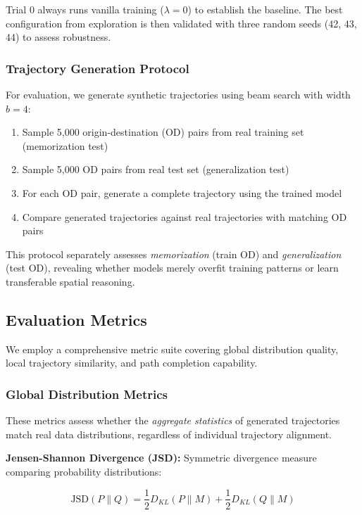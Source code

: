 Trial 0 always runs vanilla training ($\lambda = 0$) to establish the baseline. The best configuration from exploration is then validated with three random seeds (42, 43, 44) to assess robustness.

\subsubsection{Trajectory Generation Protocol}

For evaluation, we generate synthetic trajectories using beam search with width $b = 4$:

\begin{enumerate}[noitemsep,topsep=0pt]
\item Sample 5,000 origin-destination (OD) pairs from real training set (memorization test)
\item Sample 5,000 OD pairs from real test set (generalization test)
\item For each OD pair, generate a complete trajectory using the trained model
\item Compare generated trajectories against real trajectories with matching OD pairs
\end{enumerate}

This protocol separately assesses \emph{memorization} (train OD) and \emph{generalization} (test OD), revealing whether models merely overfit training patterns or learn transferable spatial reasoning.

\subsection{Evaluation Metrics}
\label{sec:eval-metrics}

We employ a comprehensive metric suite covering global distribution quality, local trajectory similarity, and path completion capability.

\subsubsection{Global Distribution Metrics}

These metrics assess whether the \emph{aggregate statistics} of generated trajectories match real data distributions, regardless of individual trajectory alignment.

\textbf{Jensen-Shannon Divergence (JSD):} Symmetric divergence measure comparing probability distributions:

\begin{equation}
\text{JSD}(P \parallel Q) = \frac{1}{2} D_{KL}(P \parallel M) + \frac{1}{2} D_{KL}(Q \parallel M)
\label{eq:jsd}
\end{equation}


